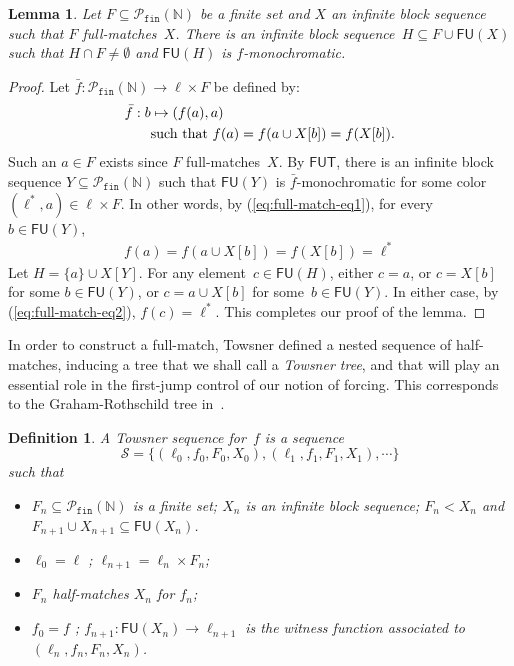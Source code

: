 \documentclass{article}
\def\Sc{\mathcal{S}}
\newcommand{\FUT}[0]{\mathsf{FUT}}
\newcommand{\NN}[0]{\mathbb{N}}
\newcommand{\Pfin}{\mathcal{P}_{\mathtt{fin}}}
\newcommand{\FU}[0]{\mathsf{FU}} %
\numberwithin{theorem}{section}
\newtheorem{lemma}[theorem]{Lemma}
\newtheorem{definition}[theorem]{Definition}
\begin{document}
\begin{lemma}
Let $F \subseteq \Pfin(\NN)$ be a finite set and $X$ an infinite block sequence such that $F$ full-matches~$X$.
There is an infinite block sequence~$H \subseteq F \cup \FU(X)$ such that $H \cap F \neq \emptyset$ and $\FU(H)$ is $f$-monochromatic. 
\end{lemma}
\begin{proof}
Let $\bar f : \Pfin(\NN) \to \ell \times F$ be defined by:
\begin{align}\label{eq:full-match-eq1}
\bar f : b & \mapsto (f(a), a) \notag \\
& \text{such that } f(a) = f(a \cup X[b]) = f(X[b]).
\end{align}
Such an $a \in F$ exists since $F$ full-matches~$X$.
By $\FUT$, there is an infinite block sequence $Y \subseteq \Pfin(\NN)$ such that $\FU(Y)$ is $\bar f$-monochromatic for some color $(\ell^*, a) \in \ell \times F$. In other words, by (\ref{eq:full-match-eq1}), for every~$b \in \FU(Y)$,
\begin{align}\label{eq:full-match-eq2}
f(a) = f(a \cup X[b]) = f(X[b]) = \ell^*
\end{align}
Let $H = \{a\} \cup X[Y]$. For any element~$c \in \FU(H)$, either $c = a$, or $c = X[b]$ for some $b \in \FU(Y)$, or $c = a \cup X[b]$ for some~$b \in \FU(Y)$. In either case, by (\ref{eq:full-match-eq2}), $f(c) = \ell^*$. This completes our proof of the lemma.
\end{proof}

In order to construct a full-match, Towsner defined a nested sequence of half-matches, inducing a tree that we shall call a \emph{Towsner tree}, and that will play an essential role in the first-jump control of our notion of forcing. This corresponds to the Graham-Rothschild tree in~\cite{liu2026reverse}.

\begin{definition}
A \emph{Towsner sequence} for~$f$ is a sequence 
$$\Sc = \{ (\ell_0, f_0, F_0, X_0), (\ell_1, f_1, F_1, X_1), \cdots \}$$
such that 
\begin{itemize}
    \item[(1)] $F_n \subseteq \Pfin(\NN)$ is a finite set; $X_n$ is an infinite block sequence; $F_n < X_n$ and $F_{n+1} \cup X_{n+1} \subseteq \FU(X_n)$.
    \item[(2)] $\ell_0 = \ell$ ; $\ell_{n+1} = \ell_n \times F_n$;
    \item[(3)] $F_n$ half-matches $X_n$ for $f_n$;
    \item[(4)] $f_0 = f$ ; $f_{n+1} : \FU(X_n) \to \ell_{n+1}$ is the witness function associated to $(\ell_n, f_n, F_n, X_n)$.
\end{itemize}
\end{definition}
\end{document}

